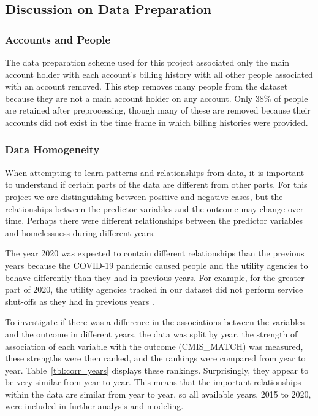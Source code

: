 \documentclass[10pt,letterpaper]{article}
\begin{document}
\subsection*{Discussion on Data Preparation}
\subsubsection*{Accounts and People}
The data preparation scheme used for this project associated only the main account holder with each account's billing history with all other people associated with an account removed. This step removes many people from the dataset because they are not a main account holder on any account. Only 38\% of people are retained after preprocessing, though many of these are removed because their accounts did not exist in the time frame in which billing histories were provided. 

\subsubsection*{Data Homogeneity}
When attempting to learn patterns and relationships from data, it is important to understand if certain parts of the data are different from other parts. For this project we are distinguishing between positive and negative cases, but the relationships between the predictor variables and the outcome may change over time. Perhaps there were different relationships between the predictor variables and homelessness during different years. 

The year 2020 was expected to contain different relationships than the previous years because the COVID-19 pandemic caused people and the utility agencies to behave differently than they had in previous years. For example, for the greater part of 2020, the utility agencies tracked in our dataset did not perform service shut-offs as they had in previous years \cite{white2020utilities}. 

To investigate if there was a difference in the associations between the variables and the outcome in different years, the data was split by year, the strength of association of each variable with the outcome (CMIS\_MATCH) was measured, these strengths were then ranked, and the rankings were compared from year to year. Table~\ref{tbl:corr_years} displays these rankings. Surprisingly, they appear to be very similar from year to year. This means that the important relationships within the data are similar from year to year, so all available years, 2015 to 2020, were included in further analysis and modeling.
\end{document}
